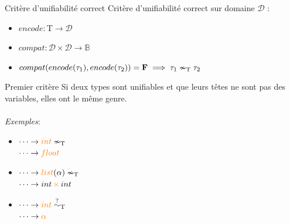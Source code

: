 \documentclass[serif]{beamer}
\newcommand{\exemples}{\textit{Exemples}\xspace}
\newcommand{\T}{\mathrm{T}}
\begin{document}
%


\begin{frame}{Critère d'unifiabilité correct}
Critère d'unifiabilité correct sur domaine $\mathscr{D}$ :
\begin{itemize}
	\item $encode : \T \rightarrow \mathscr{D}$
	\item $compat : \mathscr{D} \times \mathscr{D} \rightarrow \mathbb{B}$
	\item $compat (encode (\tau_1), encode (\tau_2)) = \bold{F} \implies \tau_1 \nsim_\T \tau_2$
\end{itemize}
\end{frame}


\begin{frame}{Premier critère}
Si deux types sont unifiables et que leurs têtes ne sont pas des variables, elles ont le même genre.
\\~\\
\exemples :
\begin{itemize}
	\item 
		$\dots \rightarrow \textcolor{orange}{int} \nsim_\T$ \\
		$\dots \rightarrow \textcolor{orange}{float}$
	\item
		$\dots \rightarrow \textcolor{orange}{list} (\alpha) \nsim_\T$ \\
		$\dots \rightarrow int \,\textcolor{orange}{\times}\, int$
	\item
		$\dots \rightarrow \textcolor{orange}{int} \stackrel{?}{\sim}_\T$ \\
		$\dots \rightarrow \textcolor{orange}{\alpha}$
\end{itemize}
\end{frame}
\end{document}
